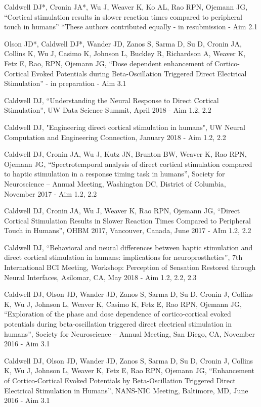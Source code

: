 \noindent Caldwell DJ*, Cronin JA*, Wu J, Weaver K, Ko AL, Rao RPN, Ojemann JG, “Cortical stimulation results in slower reaction times compared to peripheral touch in humans” *These authors contributed equally - in resubmission - Aim 2.1
\medskip

\noindent Olson JD*, Caldwell DJ*, Wander JD,  Zanos S, Sarma D, Su D, Cronin JA, Collins K, Wu J, Casimo K, Johnson L, Buckley R, Richardson A, Weaver K, Fetz E, Rao, RPN, Ojemann JG, “Dose dependent enhancement of Cortico-Cortical Evoked Potentials during Beta-Oscillation Triggered Direct Electrical Stimulation” - in preparation - Aim 3.1 
\medskip

\noindent Caldwell DJ, “Understanding the Neural Response to Direct Cortical Stimulation”, UW Data Science Summit, April 2018 - Aim 1.2, 2.2
\medskip

\noindent Caldwell DJ, "Engineering direct cortical stimulation in humans", UW Neural Computation and Engineering Connection, January 2018 - Aim 1.2, 2.2 
\medskip

\noindent Caldwell DJ, Cronin JA, Wu J, Kutz JN, Brunton BW, Weaver K, Rao RPN, Ojemann JG, “Spectrotemporal analysis of direct cortical stimulation compared to haptic stimulation in a response timing task in humans”, Society for Neuroscience – Annual Meeting, Washington DC, District of Columbia, November 2017 - Aim 1.2, 2.2 
\medskip

\noindent Caldwell DJ, Cronin JA, Wu J, Weaver K, Rao RPN, Ojemann JG, “Direct Cortical Stimulation Results in Slower Reaction Times Compared to Peripheral Touch in Humans”, OHBM 2017, Vancouver, Canada, June 2017 - AIm 1.2, 2.2
\medskip

\noindent Caldwell DJ, “Behavioral and neural differences between haptic stimulation and direct cortical stimulation in humans: implications for neuroprosthetics”, 7th International BCI Meeting, Workshop: Perception of Sensation Restored through Neural Interfaces, Asilomar, CA, May 2018 - Aim 1.2, 2.2, 2.3
\medskip

\noindent Caldwell DJ, Olson JD, Wander JD,  Zanos S, Sarma D, Su D, Cronin J, Collins K, Wu J, Johnson L, Weaver K,  Casimo K, Fetz E, Rao RPN, Ojemann JG, “Exploration of the phase and dose dependence of cortico-cortical evoked potentials during beta-oscillation triggered direct electrical stimulation in humans”, Society for Neuroscience – Annual Meeting, San Diego, CA, November 2016 - Aim 3.1 
\medskip

\noindent Caldwell DJ, Olson JD, Wander JD,  Zanos S, Sarma D, Su D, Cronin J, Collins K, Wu J, Johnson L, Weaver K, Fetz E, Rao RPN, Ojemann JG, “Enhancement of Cortico-Cortical Evoked Potentials by Beta-Oscillation Triggered Direct Electrical Stimulation in Humans”, NANS-NIC Meeting, Baltimore, MD, June 2016 - Aim 3.1
\medskip

